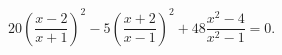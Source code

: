 \begin{ex}[type=equation]
	\begin{condition}
		$20\left(\dfrac{x -2}{x + 1}\right)^2 - 5\left(\dfrac{x + 2}{x - 1}\right)^2  + 48\dfrac{x^2 - 4}{x^2 - 1} = 0.$
	\end{condition}
\end{ex}